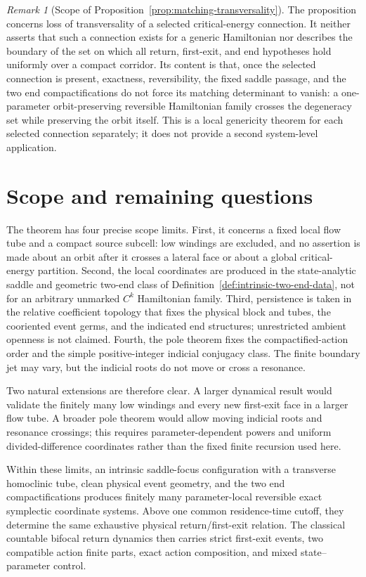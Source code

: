 \documentclass[11pt]{amsart}
\numberwithin{equation}{section}
\theoremstyle{definition}
\theoremstyle{remark}
\newtheorem{remark}[theorem]{Remark}
\begin{document}
\begin{remark}[Scope of Proposition~\ref{prop:matching-transversality}]
The proposition concerns loss of transversality of a selected
critical-energy connection.  It neither asserts that such a connection
exists for a generic Hamiltonian nor describes the boundary of the set on
which all return, first-exit, and end hypotheses hold uniformly over a
compact corridor.  Its content is that, once the selected
connection is present, exactness, reversibility, the fixed saddle passage,
and the two end compactifications do not force its matching determinant to
vanish: a one-parameter orbit-preserving reversible Hamiltonian family crosses the
degeneracy set while preserving the orbit itself.  This is a local
genericity theorem for each selected connection separately; it does not
provide a second system-level application.
\end{remark}

\section{Scope and remaining questions}
\label{sec:scope}

The theorem has four precise scope limits.  First, it concerns a fixed
local flow tube and a compact source subcell: low windings are excluded,
and no assertion is made about an orbit after it crosses a lateral face or
about a global critical-energy partition.  Second, the local coordinates
are produced in the state-analytic saddle and geometric two-end class of
Definition~\ref{def:intrinsic-two-end-data}, not for an arbitrary
unmarked $C^k$ Hamiltonian family.  Third, persistence is taken in the
relative coefficient topology that fixes the physical block and tubes,
the cooriented event germs, and the indicated end structures; unrestricted
ambient openness is not claimed.  Fourth, the pole theorem fixes the
compactified-action order and the simple positive-integer indicial
conjugacy class.  The finite boundary jet may vary, but the indicial roots
do not move or cross a resonance.

Two natural extensions are therefore clear.  A larger dynamical result
would validate the finitely many low windings and every new first-exit face
in a larger flow tube.  A broader pole theorem would allow moving indicial
roots and resonance crossings; this requires parameter-dependent powers
and uniform divided-difference coordinates rather than the fixed finite
recursion used here.

Within these limits, an intrinsic saddle-focus configuration with a
transverse homoclinic tube, clean physical event geometry, and the two end
compactifications produces finitely many parameter-local reversible exact
symplectic coordinate systems.  Above one common residence-time cutoff,
they determine the same exhaustive physical return/first-exit relation.
The classical countable bifocal return dynamics then carries strict
first-exit events, two compatible action finite parts, exact action
composition, and mixed state--parameter control.
\end{document}
